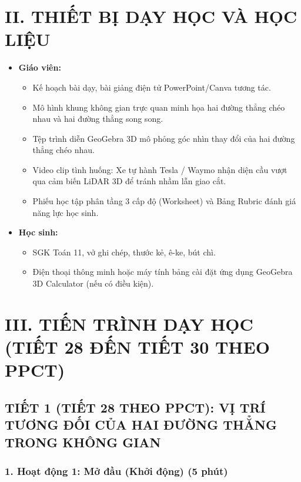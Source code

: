 \documentclass[12pt, a4paper]{article}
\begin{document}
\section*{II. THIẾT BỊ DẠY HỌC VÀ HỌC LIỆU}

\begin{itemize}[leftmargin=1.2cm]
    \item \textbf{Giáo viên:}
    \begin{itemize}[leftmargin=0.6cm]
        \item Kế hoạch bài dạy, bài giảng điện tử PowerPoint/Canva tương tác.
        \item Mô hình khung không gian trực quan minh họa hai đường thẳng chéo nhau và hai đường thẳng song song.
        \item Tệp trình diễn GeoGebra 3D mô phỏng góc nhìn thay đổi của hai đường thẳng chéo nhau.
        \item Video clip tình huống: Xe tự hành Tesla / Waymo nhận diện cầu vượt qua cảm biến LiDAR 3D để tránh nhầm lẫn giao cắt.
        \item Phiếu học tập phân tầng 3 cấp độ (Worksheet) và Bảng Rubric đánh giá năng lực học sinh.
    \end{itemize}
    \item \textbf{Học sinh:}
    \begin{itemize}[leftmargin=0.6cm]
        \item SGK Toán 11, vở ghi chép, thước kẻ, ê-ke, bút chì.
        \item Điện thoại thông minh hoặc máy tính bảng cài đặt ứng dụng GeoGebra 3D Calculator (nếu có điều kiện).
    \end{itemize}
\end{itemize}

\section*{III. TIẾN TRÌNH DẠY HỌC (TIẾT 28 ĐẾN TIẾT 30 THEO PPCT)}

\subsection*{TIẾT 1 (TIẾT 28 THEO PPCT): VỊ TRÍ TƯƠNG ĐỐI CỦA HAI ĐƯỜNG THẲNG TRONG KHÔNG GIAN}

\subsubsection*{1. Hoạt động 1: Mở đầu (Khởi động) (5 phút)}
\end{document}
